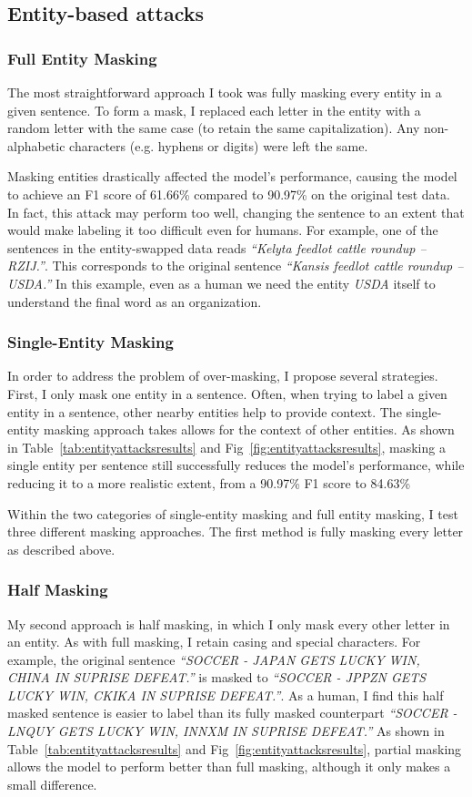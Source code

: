 \subsection{Entity-based attacks}
\subsubsection{Full Entity Masking}
The most straightforward approach I took was fully masking every entity in a given sentence. To form a mask, I replaced each letter in the entity with a random letter with the same case (to retain the same capitalization). Any non-alphabetic characters (e.g. hyphens or digits) were left the same. 

Masking entities drastically affected the model's performance, causing the model to achieve an F1 score of 61.66\% compared to 90.97\% on the original test data. In fact, this attack may perform too well, changing the sentence to an extent that would make labeling it too difficult even for humans. For example, one of the sentences in the entity-swapped data reads \textit{``Kelyta feedlot cattle roundup -- RZIJ.''}. This corresponds to the original sentence \textit{``Kansis feedlot cattle roundup -- USDA.''} In this example, even as a human we need the entity \textit{USDA} itself to understand the final word as an organization.

\subsubsection{Single-Entity Masking}
In order to address the problem of over-masking, I propose several strategies. First, I only mask one entity in a sentence. Often, when trying to label a given entity in a sentence, other nearby entities help to provide context. The single-entity masking approach takes allows for the context of other entities. As shown in Table~\ref{tab:entityattacksresults} and Fig~\ref{fig:entityattacksresults}, masking a single entity per sentence still successfully reduces the model's performance, while reducing it to a more realistic extent, from a 90.97\% F1 score to 84.63\%

Within the two categories of single-entity masking and full entity masking, I test three different masking approaches. The first method is fully masking every letter as described above.

\subsubsection{Half Masking}
 My second approach is half masking, in which I only mask every other letter in an entity. As with full masking, I retain casing and special characters. For example, the original sentence \textit{``SOCCER - JAPAN GETS LUCKY WIN, CHINA IN SUPRISE DEFEAT.''} is masked to \textit{``SOCCER - JPPZN GETS LUCKY WIN, CKIKA IN SUPRISE DEFEAT.''}. As a human, I find this half masked sentence is easier to label than its fully masked counterpart \textit{``SOCCER - LNQUY GETS LUCKY WIN, INNXM IN SUPRISE DEFEAT.''} As shown in Table~\ref{tab:entityattacksresults} and Fig~\ref{fig:entityattacksresults}, partial masking allows the model to perform better than full masking, although it only makes a small difference.
 
